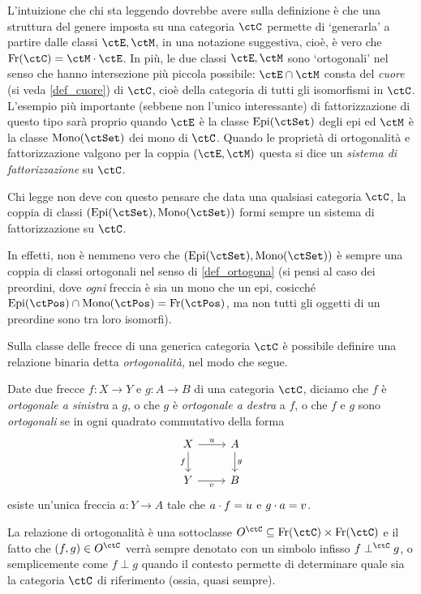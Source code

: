 L'intuizione che chi sta leggendo dovrebbe avere sulla definizione è che una struttura del genere imposta su una categoria \(\ctC\) permette di `generarla' a partire dalle classi \(\ctE,\ctM\), in una notazione suggestiva, cioè, è vero che \(\varHom(\ctC) = \ctM\cmp \ctE\). In più, le due classi \(\ctE,\ctM\) sono `ortogonali' nel senso che hanno intersezione più piccola possibile: \(\ctE\cap \ctM\) consta del \emph{cuore} (si veda \ref{def_cuore}) di \(\ctC\), cioè della categoria di tutti gli isomorfismi in \(\ctC\).
\color{red}
L'esempio più importante (sebbene non l'unico interessante) di fattorizzazione di questo tipo sarà proprio quando \(\ctE\) è la classe \(\Epi\) degli epi ed \(\ctM\) è la classe \(\Mono\) dei mono di \(\ctC\). Quando le proprietà di ortogonalità e fattorizzazione valgono per la coppia \((\ctE,\ctM)\) questa si dice un \emph{sistema di fattorizzazione} su \(\ctC\).
\begin{remark}
 Chi legge non deve con questo pensare che data una qualsiasi categoria \(\ctC\), la coppia di classi \((\Epi,\Mono)\) formi sempre un sistema di fattorizzazione su \(\ctC\).

 In effetti, non è nemmeno vero che \((\Epi,\Mono)\) è sempre una coppia di classi ortogonali nel senso di \ref{def_ortogona} (si pensi al caso dei preordini, dove \emph{ogni} freccia è sia un mono che un epi, cosicché \(\Epi[\ctPos]\cap\Mono[\ctPos]=\varHom(\ctPos)\), ma non tutti gli oggetti di un preordine sono tra loro isomorfi).
\end{remark}
\color{black}
Sulla classe delle frecce di una generica categoria \(\ctC\) è possibile definire una relazione binaria detta \emph{ortogonalità}, nel modo che segue.
\begin{definition}\label{def_ortogona}
 Date due frecce \(f \colon X\to Y\) e \(g \colon A\to B\) di una categoria \(\ctC\), diciamo che \(f\) è \emph{ortogonale a sinistra} a \(g\), o che \(g\) è \emph{ortogonale a destra} a \(f\), o che \(f\) e \(g\) sono \emph{ortogonali} se in ogni quadrato commutativo della forma
 \[
  \begin{tikzcd}
   X \ar[d, "f"']\ar[r, "u"]& A\ar[d, "g"] \\
   Y \ar[r, "v"']& B
  \end{tikzcd}
 \]
 esiste un'unica freccia \(a \colon Y\to A\) tale che \(a\cdot f=u\) e \(g\cdot a=v\).
\end{definition}
La relazione di ortogonalità è una sottoclasse \(O^\ctC \subseteq \varHom(\ctC)\times\varHom(\ctC)\) e il fatto che \((f,g)\in O^\ctC\) verrà sempre denotato con un simbolo infisso \(f\perp^\ctC g\), o semplicemente come \(f\perp g\) quando il contesto permette di determinare quale sia la categoria \(\ctC\) di riferimento (ossia, quasi sempre).

